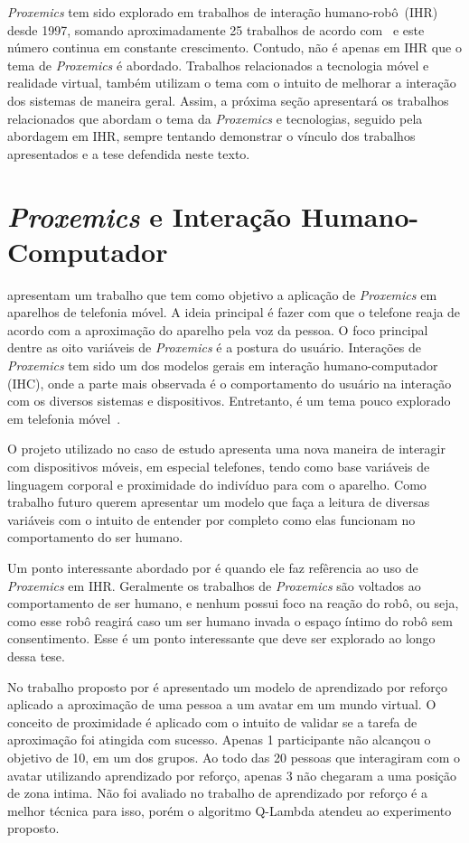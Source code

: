 \emph{Proxemics} tem sido explorado em trabalhos de interação humano-robô~(IHR) desde 1997, somando aproximadamente 25 trabalhos de acordo com~ e este número continua em constante crescimento. Contudo, não é apenas em IHR que o tema de \emph{Proxemics} é abordado. Trabalhos relacionados a tecnologia móvel e realidade virtual, também utilizam o tema com o intuito de melhorar a interação dos sistemas de maneira geral. Assim, a próxima seção apresentará os trabalhos relacionados que abordam o tema da \emph{Proxemics} e tecnologias, seguido pela abordagem em IHR, sempre tentando demonstrar o vínculo dos trabalhos apresentados e a tese defendida neste texto.

\section{\emph{Proxemics} e Interação Humano-Computador}
\label{sec:proxemicstec}
 apresentam um trabalho que tem como objetivo a aplicação de \emph{Proxemics} em aparelhos de telefonia móvel. A ideia principal é fazer com que o telefone reaja de acordo com a aproximação do aparelho pela voz da pessoa. O foco principal dentre as oito variáveis de \emph{Proxemics} é a postura do usuário. Interações de \emph{Proxemics} tem sido um dos modelos gerais em interação humano-computador (IHC), onde a parte mais observada é o comportamento do usuário na interação com os diversos sistemas e dispositivos. Entretanto, é um tema pouco explorado em telefonia móvel~\cite{Hemmert:2013}.

O projeto utilizado no caso de estudo apresenta uma nova maneira de interagir com dispositivos móveis, em especial telefones, tendo como base variáveis de linguagem corporal e proximidade do indivíduo para com o aparelho. Como trabalho futuro  querem apresentar um modelo que faça a leitura de diversas variáveis com o intuito de entender por completo como elas funcionam no comportamento do ser humano.

Um ponto interessante abordado por  é quando ele faz refêrencia ao uso de \emph{Proxemics} em IHR. Geralmente os trabalhos de \emph{Proxemics} são voltados ao comportamento de ser humano, e nenhum possui foco na reação do robô, ou seja, como esse robô reagirá caso um ser humano invada o espaço íntimo do robô sem consentimento. Esse é um ponto interessante que deve ser explorado ao longo dessa tese.

No trabalho proposto por  é apresentado um modelo de aprendizado por reforço aplicado a aproximação de uma pessoa a um avatar em um mundo virtual. O conceito de proximidade é aplicado com o intuito de validar se a tarefa de aproximação foi atingida com sucesso. Apenas 1 participante não alcançou o objetivo de 10, em um dos grupos. Ao todo das 20 pessoas que interagiram com o avatar utilizando aprendizado por reforço, apenas 3 não chegaram a uma posição de zona intima. Não foi avaliado no trabalho de aprendizado por reforço é a melhor técnica para isso, porém o algoritmo Q-Lambda atendeu ao experimento proposto.

